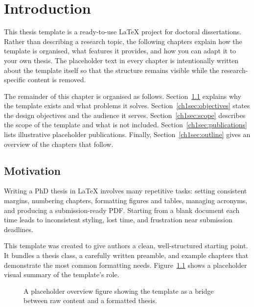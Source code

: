 \chapter{Introduction}
\glsresetall

This thesis template is a ready-to-use \LaTeX{} project for doctoral dissertations. Rather than describing a research topic, the following chapters explain how the template is organised, what features it provides, and how you can adapt it to your own thesis. The placeholder text in every chapter is intentionally written about the template itself so that the structure remains visible while the research-specific content is removed.

The remainder of this chapter is organised as follows. Section~\ref{ch1sec:motivation} explains why the template exists and what problems it solves. Section~\ref{ch1sec:objectives} states the design objectives and the audience it serves. Section~\ref{ch1sec:scope} describes the scope of the template and what is not included. Section~\ref{ch1sec:publications} lists illustrative placeholder publications. Finally, Section~\ref{ch1sec:outline} gives an overview of the chapters that follow.


\section{Motivation}\label{ch1sec:motivation}

Writing a PhD thesis in \LaTeX{} involves many repetitive tasks: setting consistent margins, numbering chapters, formatting figures and tables, managing acronyms, and producing a submission-ready PDF. Starting from a blank document each time leads to inconsistent styling, lost time, and frustration near submission deadlines.

This template was created to give authors a clean, well-structured starting point. It bundles a thesis class, a carefully written preamble, and example chapters that demonstrate the most common formatting needs. Figure~\ref{fig:demo-overview} shows a placeholder visual summary of the template's role.

\begin{figure}[ht]
\centering
{}
\caption[Template overview]{A placeholder overview figure showing the template as a bridge between raw content and a formatted thesis.}\label{fig:demo-overview}
\end{figure}

